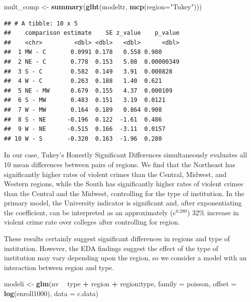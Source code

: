 \documentclass[
]{krantz}
\newenvironment{Shaded}{\begin{snugshade}}{\end{snugshade}}
\newcommand{\DataTypeTok}[1]{\textcolor[rgb]{0.27,0.27,0.27}{#1}}
\newcommand{\KeywordTok}[1]{\textcolor[rgb]{0.27,0.27,0.27}{\textbf{#1}}}
\newcommand{\NormalTok}[1]{#1}
\newcommand{\OperatorTok}[1]{\textcolor[rgb]{0.43,0.43,0.43}{\textbf{#1}}}
\newcommand{\StringTok}[1]{\textcolor[rgb]{0.5,0.5,0.5}{#1}}
\begin{document}
\begin{Shaded}
\begin{Highlighting}[]
\NormalTok{mult_comp <-}\StringTok{ }\KeywordTok{summary}\NormalTok{(}\KeywordTok{glht}\NormalTok{(modeltr, }\KeywordTok{mcp}\NormalTok{(}\DataTypeTok{region=}\StringTok{"Tukey"}\NormalTok{)))}
\end{Highlighting}
\end{Shaded}

\begin{verbatim}
## # A tibble: 10 x 5
##    comparison estimate    SE z_value    p_value
##    <chr>         <dbl> <dbl>   <dbl>      <dbl>
##  1 MW - C       0.0991 0.178   0.558 0.980     
##  2 NE - C       0.778  0.153   5.08  0.00000349
##  3 S - C        0.582  0.149   3.91  0.000828  
##  4 W - C        0.263  0.188   1.40  0.621     
##  5 NE - MW      0.679  0.155   4.37  0.000109  
##  6 S - MW       0.483  0.151   3.19  0.0121    
##  7 W - MW       0.164  0.189   0.864 0.908     
##  8 S - NE      -0.196  0.122  -1.61  0.486     
##  9 W - NE      -0.515  0.166  -3.11  0.0157    
## 10 W - S       -0.320  0.163  -1.96  0.280
\end{verbatim}

In our case, Tukey's Honestly Significant Differences simultaneously evaluates all 10 mean differences between pairs of regions. We find that the Northeast has significantly higher rates of violent crimes than the Central, Midwest, and Western regions, while the South has significantly higher rates of violent crimes than the Central and the Midwest, controlling for the type of institution. In the primary model, the University indicator is significant and, after exponentiating the coefficient, can be interpreted as an approximately (\(e^{0.280}\)) 32\% increase in violent crime rate over colleges after controlling for region.

These results certainly suggest significant differences in regions and type of institution. However, the EDA findings suggest the effect of the type of institution may vary depending upon the region, so we consider a model with an interaction between region and type.

\begin{Shaded}
\begin{Highlighting}[]
\NormalTok{modeli <-}\StringTok{ }\KeywordTok{glm}\NormalTok{(nv }\OperatorTok{~}\StringTok{ }\NormalTok{type }\OperatorTok{+}\StringTok{ }\NormalTok{region }\OperatorTok{+}\StringTok{ }\NormalTok{region}\OperatorTok{:}\NormalTok{type, }
              \DataTypeTok{family =}\NormalTok{ poisson,}
              \DataTypeTok{offset =} \KeywordTok{log}\NormalTok{(enroll1000), }\DataTypeTok{data =}\NormalTok{ c.data)}
\end{Highlighting}
\end{Shaded}
\end{document}
